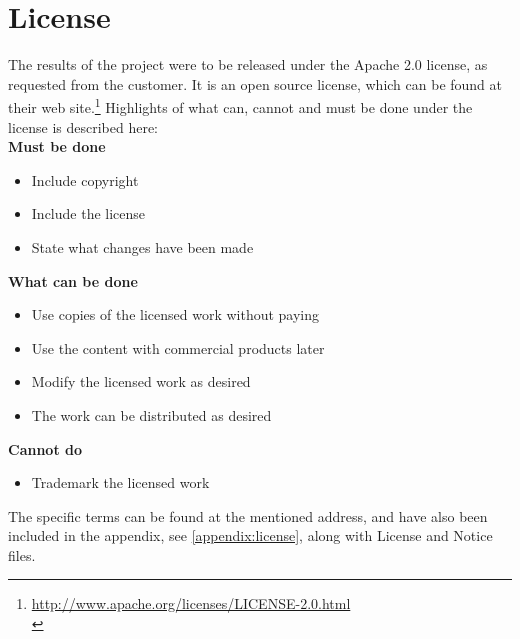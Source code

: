 \section{License}
The results of the project were to be released under the Apache 2.0 license, as requested from the customer. It is an open source license, which can be found  at their web site.\footnote{\url{http://www.apache.org/licenses/LICENSE-2.0.html}\\}
Highlights of what can, cannot and must be done under the license is described here:\\
\textbf{Must be done}
\begin{itemize}
\item Include copyright
\item Include the license
\item State what changes have been made
\end{itemize}
\textbf{What can be done}
\begin{itemize}
\item Use copies of the licensed work without paying
\item Use the content with commercial products later
\item Modify the licensed work as desired
\item The work can be distributed as desired
\end{itemize}
\textbf{Cannot do}
\begin{itemize}
\item Trademark the licensed work
\end{itemize}
The specific terms can be found at the mentioned address, and have also been included in the appendix, see \ref{appendix:license}, along with License and Notice files.
